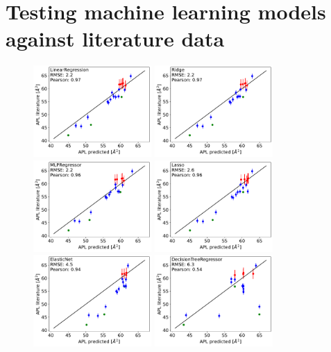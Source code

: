 \documentclass[fleqn,10pt]{wlscirepSI}
\begin{document}
\section{Testing machine learning models against literature data}
\begin{figure}[hb]
    \centering
    \includegraphics[width=45mm]{Figures/MLtest/LinearRegressiontest.pdf}
    \includegraphics[width=45mm]{Figures/MLtest/Ridgetest.pdf}
    \includegraphics[width=45mm]{Figures/MLtest/MLPRegressortest.pdf}
    \includegraphics[width=45mm]{Figures/MLtest/Lassotest.pdf}
    \includegraphics[width=45mm]{Figures/MLtest/ElasticNettest.pdf}
    \includegraphics[width=45mm]{Figures/MLtest/DecisionTreeRegressortest.pdf}

\end{figure}
\end{document}
